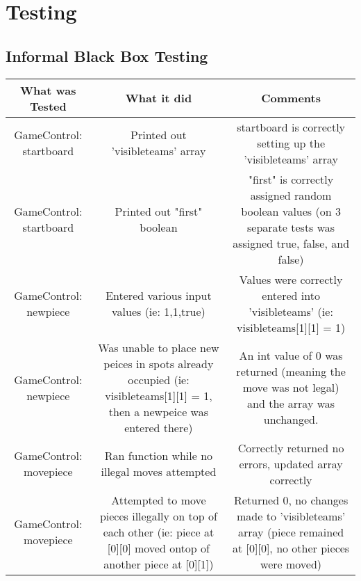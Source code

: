 \documentclass[12pt]{article}
\begin{document}
	
	\newpage	
	\section{Testing}
	\subsection{Informal Black Box Testing}
	\begin{tabularx}{\linewidth}{|C|C|C|}
		\hline
		What was Tested & What it did & Comments \\
		\hline 
    GameControl: startboard & Printed out 'visibleteams' array & startboard is correctly setting up the 'visibleteams' array \\
    \hline 
    GameControl: startboard & Printed out "first" boolean & "first" is correctly assigned random boolean values (on 3 separate tests was assigned true, false, and false) \\
    \hline 
    GameControl: newpiece & Entered various input values (ie: 1,1,true) & Values were correctly entered into 'visibleteams' (ie: visibleteams[1][1] = 1) \\
    \hline 
    GameControl: newpiece & Was unable to place new peices in spots already occupied (ie: visibleteams[1][1] = 1, then a newpeice was entered there) & An int value of 0 was returned (meaning the move was not legal) and the array was unchanged. \\ 
    \hline 
    GameControl: movepiece & Ran function while no illegal moves attempted & Correctly returned no errors, updated array correctly \\
    \hline 
    GameControl: movepiece & Attempted to move pieces illegally on top of each other (ie: piece at [0][0] moved ontop of another piece at [0][1]) & Returned 0, no changes made to 'visibleteams' array (piece remained at [0][0], no other pieces were moved) \\
    \hline 
	\end{tabularx}
	
\end{document}
